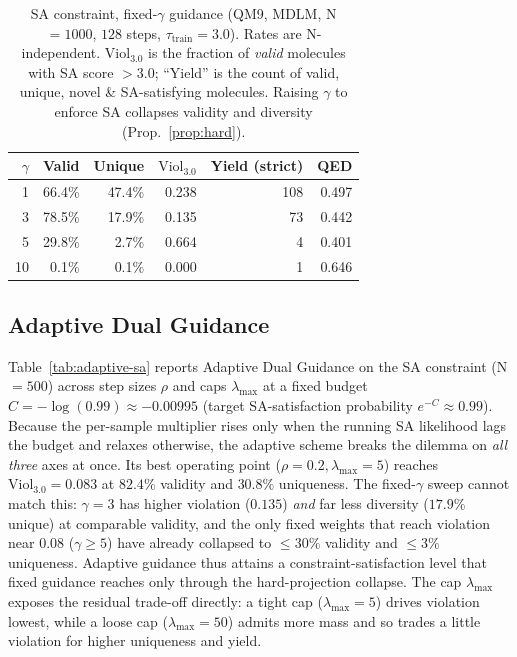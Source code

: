 \documentclass{article}
\begin{document}
\begin{table}[t]
\centering
\caption{SA constraint, fixed-$\gamma$ guidance (QM9, MDLM, N$=1000$, $128$ steps, $\tau_{\text{train}}{=}3.0$). Rates are N-independent. $\mathrm{Viol}_{3.0}$ is the fraction of \emph{valid} molecules with SA score $>3.0$; ``Yield'' is the count of valid, unique, novel \& SA-satisfying molecules. Raising $\gamma$ to enforce SA collapses validity and diversity (Prop.~\ref{prop:hard}).}
\label{tab:sa-fixed}
\begin{tabular}{rrrrrr}
\toprule
$\gamma$ & Valid & Unique & $\mathrm{Viol}_{3.0}$ & Yield (strict) & QED \\
\midrule
1  & 66.4\% & 47.4\% & 0.238 & 108 & 0.497 \\
3  & 78.5\% & 17.9\% & 0.135 & 73  & 0.442 \\
5  & 29.8\% & 2.7\%  & 0.664 & 4   & 0.401 \\
10 & 0.1\%  & 0.1\%  & 0.000 & 1   & 0.646 \\
\bottomrule
\end{tabular}
\end{table}

\subsection{Adaptive Dual Guidance}
Table~\ref{tab:adaptive-sa} reports Adaptive Dual Guidance on the SA constraint (N$=500$) across step sizes $\rho$ and caps $\lambda_{\max}$ at a fixed budget $C=-\log(0.99)\approx-0.00995$ (target SA-satisfaction probability $e^{-C}\approx0.99$). Because the per-sample multiplier rises only when the running SA likelihood lags the budget and relaxes otherwise, the adaptive scheme breaks the dilemma on \emph{all three} axes at once. Its best operating point ($\rho{=}0.2,\lambda_{\max}{=}5$) reaches $\mathrm{Viol}_{3.0}=0.083$ at $82.4\%$ validity and $30.8\%$ uniqueness. The fixed-$\gamma$ sweep cannot match this: $\gamma{=}3$ has higher violation ($0.135$) \emph{and} far less diversity ($17.9\%$ unique) at comparable validity, and the only fixed weights that reach violation near $0.08$ ($\gamma\ge5$) have already collapsed to $\le30\%$ validity and $\le3\%$ uniqueness. Adaptive guidance thus attains a constraint-satisfaction level that fixed guidance reaches only through the hard-projection collapse. The cap $\lambda_{\max}$ exposes the residual trade-off directly: a tight cap ($\lambda_{\max}{=}5$) drives violation lowest, while a loose cap ($\lambda_{\max}{=}50$) admits more mass and so trades a little violation for higher uniqueness and yield.
\end{document}
